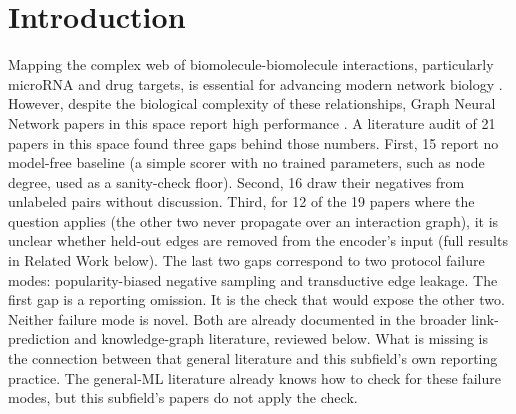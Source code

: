 \documentclass[review]{elsarticle}
\begin{document}
\linenumbers


\section{Introduction}
\label{sec:intro}
Mapping the complex web of biomolecule-biomolecule interactions, particularly microRNA
and drug targets, is essential for advancing modern network biology
\cite{vidal2011interactome}. However,
despite the biological complexity of these relationships, Graph Neural Network papers
in this space report high performance \cite{tian2024mgcnss,jin2022nimgsa,
ahmad2026hybridgnn,yu2022hgdti,cao2024ngcn,zhang2024kmerpmtf,orro2026mirnadisease,
li2025couplemda,zeng2025gonnmda,liu2024digamn,lu2024dgnmda,yu2022hlgnnmda,
huang2022meahne,li2022cksnpgnn,liang2023hmcda,wang2026higldp,xiong2025gpsdti,
zhang2025saegraphdti,yang2025dtimhapr,sun2024ingnndti,jia2024modulepred}. A literature
audit of 21 papers in this space found three gaps behind those numbers. First, 15 report no
model-free baseline (a simple scorer with no trained parameters, such as node degree, used as a
sanity-check floor). Second, 16 draw their negatives from unlabeled pairs without
discussion. Third, for 12 of the 19 papers where the question applies (the other two never
propagate over an interaction graph), it is unclear whether held-out edges are removed from
the encoder's input (full results in Related Work below). The last two
gaps correspond to two protocol failure modes: popularity-biased negative sampling and
transductive edge leakage. The first gap is a reporting omission. It is the check that
would expose the other two. Neither failure mode is novel. Both are already documented
in the broader link-prediction and knowledge-graph literature, reviewed below. What is
missing is the connection between that general literature and this subfield's own
reporting practice. The general-ML literature already knows how to check for these
failure modes, but this subfield's papers do not apply the check.
\end{document}
